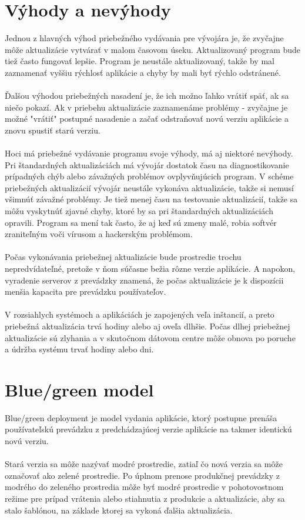 \documentclass[10pt,twoside,slovak,a4paper]{article}
\begin{document}
\section{Výhody a nevýhody}
	Jednou z hlavných výhod priebežného vydávania pre vývojára je, že zvyčajne môže aktualizácie vytvárať v malom časovom úseku. Aktualizovaný program bude tiež často fungovať lepšie. Program je neustále aktualizovaný, takže by mal zaznamenať vyššiu rýchlosť aplikácie a chyby by mali byť rýchlo odstránené.\\\\
Ďalšou výhodou priebežných nasadení je, že ich možno ľahko vrátiť späť, ak sa niečo pokazí. Ak v priebehu aktualizácie zaznamenáme problémy - zvyčajne je možné "vrátiť" postupné nasadenie a začať odstraňovať novú verziu aplikácie a znovu spustiť starú verziu.\\\\
	Hoci má priebežné vydávanie programu svoje výhody, má aj niektoré nevýhody. Pri štandardných aktualizáciách má vývojár dostatok času na diagnostikovanie prípadných chýb alebo závažných problémov ovplyvňujúcich program. V schéme priebežných aktualizácií vývojár neustále vykonáva aktualizácie, takže si nemusí všimnúť závažné problémy. Je tiež menej času na testovanie aktualizácií, takže sa môžu vyskytnúť zjavné chyby, ktoré by sa pri štandardných aktualizáciách opravili. Program sa mení tak často, že aj keď sú zmeny malé, robia softvér zraniteľným voči vírusom a hackerským problémom.\\\\
	 Počas vykonávania priebežnej aktualizácie bude prostredie trochu nepredvídateľné, pretože v ňom súčasne bežia rôzne verzie aplikácie. A napokon, vyradenie serverov z prevádzky znamená, že počas aktualizácie je k dispozícii menšia kapacita pre prevádzku používateľov.\\\\
V rozsiahlych systémoch a aplikáciách je zapojených veľa inštancií, a preto priebežná aktualizácia trvá hodiny alebo aj oveľa dlhšie. Počas dlhej priebežnej aktualizácie sú zlyhania a v skutočnom dátovom centre môže obnova po poruche a údržba systému trvať hodiny alebo dni. \cite{7586059}


\section{Blue/green model}
Blue/green deployment je model vydania aplikácie, ktorý postupne prenáša používateľskú prevádzku z predchádzajúcej verzie aplikácie  na takmer identickú novú verziu. \\\\
Stará verzia sa môže nazývať modré prostredie, zatiaľ čo nová verzia sa môže označovať ako zelené prostredie. Po úplnom prenose produkčnej prevádzky z modrého do zeleného prostredia môže byť modré prostredie v pohotovostnom režime pre prípad vrátenia alebo stiahnutia z produkcie a aktualizácie, aby sa stalo šablónou, na základe ktorej sa vykoná ďalšia aktualizácia.
\end{document}
